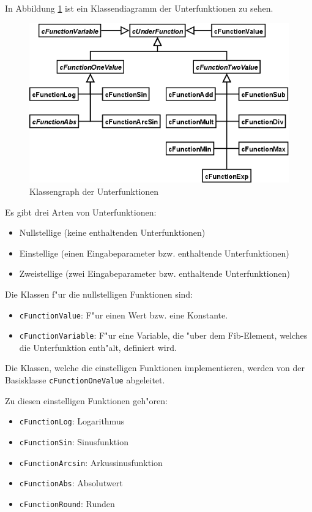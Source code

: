 In Abbildung \ref{figClassUnderfunctions} ist ein Klassendiagramm der Unterfunktionen zu sehen.

\begin{figure}[htbp]
\begin{center}
  \includegraphics[scale=0.4]{fib_underfunctions}
\end{center}
\caption{Klassengraph der Unterfunktionen}
\label{figClassUnderfunctions}
\end{figure}


\bigskip\noindent
Es gibt drei Arten von Unterfunktionen:
\begin{itemize}
 \item Nullstellige (keine enthaltenden Unterfunktionen)
 \item Einstellige (einen Eingabeparameter bzw. enthaltende Unterfunktionen)
 \item Zweistellige (zwei Eingabeparameter bzw. enthaltende Unterfunktionen)
\end{itemize}

\bigskip\noindent
Die Klassen f"ur die nullstelligen Funktionen sind:
\begin{itemize}
 \item \verb|cFunctionValue|: F"ur einen Wert bzw. eine Konstante.
 \item \verb|cFunctionVariable|: F"ur eine Variable, die "uber dem Fib-Element, welches die Unterfunktion enth"alt, definiert wird.
\end{itemize}

\bigskip\noindent
Die Klassen, welche die einstelligen Funktionen implementieren, werden von der Basisklasse \verb|cFunctionOneValue| abgeleitet.

\bigskip\noindent
Zu diesen einstelligen Funktionen geh"oren:
\begin{itemize}
 \item \verb|cFunctionLog|: Logarithmus
 \item \verb|cFunctionSin|: Sinusfunktion
 \item \verb|cFunctionArcsin|: Arkussinusfunktion
 \item \verb|cFunctionAbs|: Absolutwert
 \item \verb|cFunctionRound|: Runden
\end{itemize}


